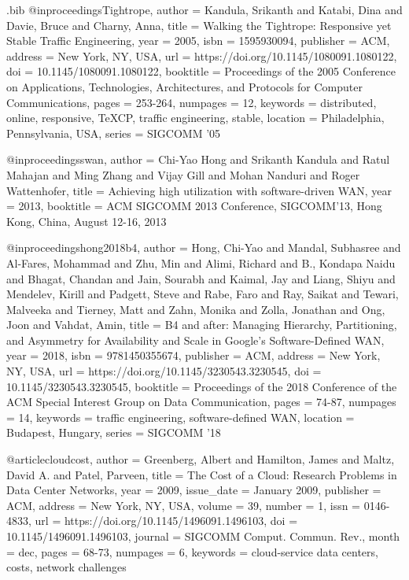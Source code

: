 \documentclass[sigconf]{acmart}
\begin{document}
\begin{filecontents}{\jobname.bib}
  @inproceedings{Tightrope, author = {Kandula, Srikanth and Katabi, Dina and Davie, Bruce and Charny, Anna}, title = {Walking the Tightrope: Responsive yet Stable Traffic Engineering}, year = {2005}, isbn = {1595930094}, publisher = {ACM}, address = {New York, NY, USA}, url = {https://doi.org/10.1145/1080091.1080122}, doi = {10.1145/1080091.1080122}, booktitle = {Proceedings of the 2005 Conference on Applications, Technologies, Architectures, and Protocols for Computer Communications}, pages = {253-264}, numpages = {12}, keywords = {distributed, online, responsive, TeXCP, traffic engineering, stable}, location = {Philadelphia, Pennsylvania, USA}, series = {SIGCOMM '05} }
  
  
  
@inproceedings{swan,
author    = {Chi{-}Yao Hong and Srikanth Kandula and  Ratul Mahajan and  Ming Zhang and Vijay Gill and Mohan Nanduri and Roger Wattenhofer},
title     = {Achieving high utilization with software-driven {WAN}},
year = {2013},
booktitle = {{ACM} {SIGCOMM} 2013 Conference, SIGCOMM'13, Hong Kong, China, August 12-16, 2013}
}


@inproceedings{hong2018b4, author = {Hong, Chi-Yao and Mandal, Subhasree and Al-Fares, Mohammad and Zhu, Min and Alimi, Richard and B., Kondapa Naidu and Bhagat, Chandan and Jain, Sourabh and Kaimal, Jay and Liang, Shiyu and Mendelev, Kirill and Padgett, Steve and Rabe, Faro and Ray, Saikat and Tewari, Malveeka and Tierney, Matt and Zahn, Monika and Zolla, Jonathan and Ong, Joon and Vahdat, Amin}, title = {B4 and after: Managing Hierarchy, Partitioning, and Asymmetry for Availability and Scale in Google's Software-Defined WAN}, year = {2018}, isbn = {9781450355674}, publisher = {ACM}, address = {New York, NY, USA}, url = {https://doi.org/10.1145/3230543.3230545}, doi = {10.1145/3230543.3230545}, booktitle = {Proceedings of the 2018 Conference of the ACM Special Interest Group on Data Communication}, pages = {74-87}, numpages = {14}, keywords = {traffic engineering, software-defined WAN}, location = {Budapest, Hungary}, series = {SIGCOMM '18} }

@article{cloudcost, author = {Greenberg, Albert and Hamilton, James and Maltz, David A. and Patel, Parveen}, title = {The Cost of a Cloud: Research Problems in Data Center Networks}, year = {2009}, issue_date = {January 2009}, publisher = {ACM}, address = {New York, NY, USA}, volume = {39}, number = {1}, issn = {0146-4833}, url = {https://doi.org/10.1145/1496091.1496103}, doi = {10.1145/1496091.1496103}, journal = {SIGCOMM Comput. Commun. Rev.}, month = dec, pages = {68-73}, numpages = {6}, keywords = {cloud-service data centers, costs, network challenges} }



\end{filecontents}
\end{document}
